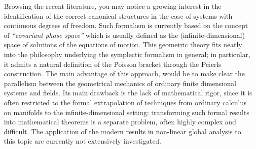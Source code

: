\documentclass[Main]{subfiles}
\begin{document}
	Browsing the recent literature, you may notice a growing interest in the identification of the correct canonical structures in the case of systems with continuous degrees of freedom.
	Such formalism is currently based on the concept of \emph{“covariant phase space”} which is usually defined as the (infinite-dimensional) space of solutions of the equations of motion. 
				This geometric theory fits neatly into the philosophy underlying the symplectic formalism in general; in particular, it admits a natural definition of the Poisson bracket through the Peierls construction.
		The main advantage of this approach, would be to make clear the parallelism between the geometrical mechanics of ordinary finite dimensional systems and fields. 
		Its main drawback is the lack of mathematical rigor, since it is often restricted to the formal extrapolation of techniques from ordinary calculus on manifolds to the infinite-dimensional setting: transforming such formal results into mathematical theorems is a separate problem, often highly complex and difficult.		
		The application of the modern results in non-linear global analysis to this topic are currently not extensively investigated.
	
\end{document}
